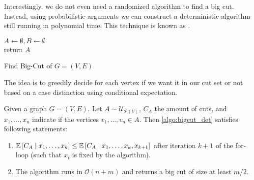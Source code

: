 Interestingly, we do not even need a randomized algorithm to find a big cut.
Instead, using probabilistic arguments we can construct a deterministic algorithm still running in polynomial time.
This technique is known as .
\newline
\begin{algorithm}[H]
    \label{algo:bigcut_det}
    \SetAlgoLined
    $A \leftarrow \emptyset, B \leftarrow \emptyset$\\
    return $A$
    \caption{Find Big-Cut of $G = (V,E)$}
\end{algorithm}
The idea is to greedily decide for each vertex if we want it in our cut set or not
based on a case distinction using conditional expectation. 
\begin{theorem}
    Given a graph $G = (V,E)$.
    Let $A \sim \mathcal{U}_{\mathcal{P}(V)}$, $C_A$ the amount of cuts,
    and $x_1, \dots, x_n$ indicate if the vertices $v_1, \dots, v_n \in A$.
    Then \autoref{algo:bigcut_det} satisfies following statements:
    \begin{enumerate}
        \item $\mathbb{E}\left[C_A \mid x_1, \dots, x_k\right] \leq \mathbb{E}\left[C_A \mid x_1, \dots, x_k, x_{k+1}\right]$ after iteration $k+1$ of the for-loop 
        (such that $x_i$ is fixed by the algorithm).
        \item The algorithm runs in $\mathcal{O}(n+m)$
              and returns a big cut of size at least $m/2$.
    \end{enumerate}
\end{theorem}
